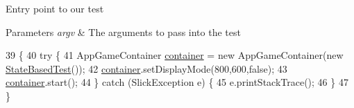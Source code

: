 Entry point to our test


\begin{DoxyParams}{Parameters}
{\em argv} & The arguments to pass into the test \\
\hline
\end{DoxyParams}

\begin{DoxyCode}
39                                            \{
40         \textcolor{keywordflow}{try} \{
41             AppGameContainer \mbox{\hyperlink{classorg_1_1newdawn_1_1slick_1_1state_1_1_state_based_game_a538846600436175cbed48450adfdd025}{container}} = \textcolor{keyword}{new} AppGameContainer(\textcolor{keyword}{new} 
      \mbox{\hyperlink{classorg_1_1newdawn_1_1slick_1_1tests_1_1_state_based_test_adda4a4dfe7070c4b4cea79dd83158757}{StateBasedTest}}());
42             \mbox{\hyperlink{classorg_1_1newdawn_1_1slick_1_1state_1_1_state_based_game_a538846600436175cbed48450adfdd025}{container}}.setDisplayMode(800,600,\textcolor{keyword}{false});
43             \mbox{\hyperlink{classorg_1_1newdawn_1_1slick_1_1state_1_1_state_based_game_a538846600436175cbed48450adfdd025}{container}}.start();
44         \} \textcolor{keywordflow}{catch} (SlickException e) \{
45             e.printStackTrace();
46         \}
47     \}
\end{DoxyCode}
